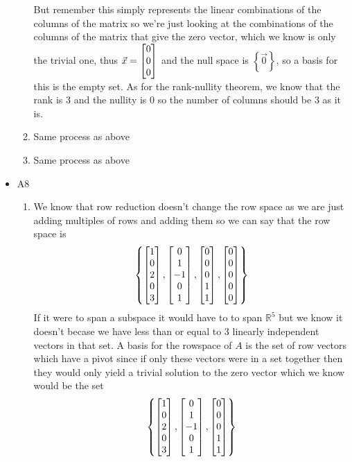 \documentclass[11pt]{book}
\begin{document}
\begin{ex}
\begin{itemize}
\begin{enumerate}
\[                    \]
                    But remember this simply represents the linear combinations of the columns of the matrix so we're just looking at the combinations of the columns of the matrix that give the zero vector, which we know is only the trivial one, thus $\vec{x} = \begin{bmatrix} 0 \\ 0 \\ 0 \end{bmatrix}$ and the null space is $\left\{ \vec{0} \right\}$, so a basis for this is the empty set.
                As for the rank-nullity theorem, we know that the rank is 3 and the nullity is 0 so the number of columns should be 3 as it is.
            \item Same process as above
            \item Same process as above
            \end{enumerate}
        \item A8
            \begin{enumerate}
                \item We know that row reduction doesn't change the row space as we are just adding multiples of rows and adding them so we can say that the row space is 
                    \[
                    \left\{ \begin{bmatrix} 1 \\ 0 \\ 2 \\ 0 \\ 3 \end{bmatrix}, \begin{bmatrix} 0 \\ 1 \\ -1 \\ 0 \\ 1 \end{bmatrix}, \begin{bmatrix} 0 \\ 0 \\ 0 \\ 1 \\ 1 \end{bmatrix}, \begin{bmatrix} 0 \\ 0 \\ 0 \\ 0 \\ 0 \end{bmatrix} \right\}
                    \]
                    If it were to span a subspace it would have to to span $\mathbb{R}^{5}$ but we know it doesn't becase we have less than or equal to  3 linearly independent vectors in that set.
                    A basis for the rowspace of $A$ is the set of row vectors which have a pivot since if only these vectors were in a set together then they would only yield a trivial solution to the zero vector which we know would be  the set
                    \[
                    \left\{ \begin{bmatrix} 1 \\ 0 \\ 2 \\ 0 \\ 3 \end{bmatrix}, \begin{bmatrix} 0 \\ 1 \\ -1 \\ 0 \\ 1 \end{bmatrix}, \begin{bmatrix} 0 \\ 0 \\ 0 \\ 1 \\ 1 \end{bmatrix} \right\}
\]
\end{enumerate}
\end{itemize}
\end{ex}
\end{document}
